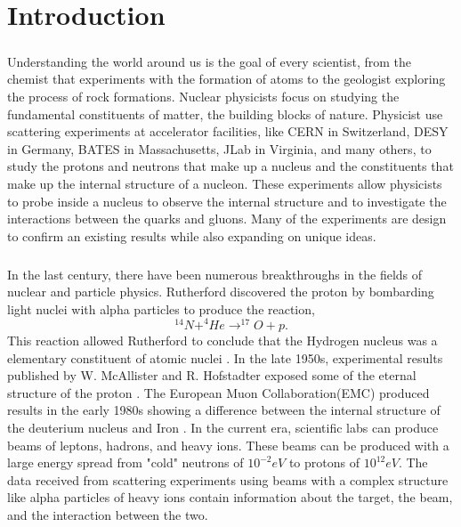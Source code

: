 


\chapter{Introduction}\paragraph{}Understanding the world around us is the goal of every scientist, from the chemist that experiments with the formation of atoms to the geologist exploring the process of rock formations. Nuclear physicists focus on studying the fundamental constituents of matter, the building blocks of nature. Physicist use scattering experiments at accelerator facilities, like CERN in Switzerland, DESY in Germany, BATES in Massachusetts, JLab in Virginia, and many others, to study the protons and neutrons that make up a nucleus and the constituents that make up the internal structure of a nucleon. These experiments allow physicists to probe inside a nucleus to observe the internal structure and to investigate the interactions between the quarks and gluons. Many of the experiments are design to confirm an existing results while also expanding on unique ideas.
\paragraph{}In the last century, there have been numerous breakthroughs in the fields of nuclear and particle physics. Rutherford discovered the proton by bombarding light nuclei with alpha particles to produce the reaction,  
	\begin{equation}
	^{14}N + ^4He \rightarrow ^{17}O + p.
	\end{equation}
This reaction allowed Rutherford to conclude that the Hydrogen nucleus was a elementary constituent of atomic nuclei \cite{PnN}. In the late 1950s, experimental results published by W. McAllister and R. Hofstadter exposed some of the eternal structure of the proton \cite{Flay,Hof}. The European Muon Collaboration(EMC) produced results in the early 1980s showing a difference between the internal structure of the deuterium nucleus and Iron \cite{seeley,CC}. In the current era, scientific labs can produce beams of leptons, hadrons, and heavy ions. These beams can be produced with a large energy spread from "cold" neutrons of $10^{-2}eV$ to protons of $10^{12}eV$. The data received from scattering experiments using beams with a complex structure like alpha particles of heavy ions contain information about the target, the beam, and the interaction between the two. 
